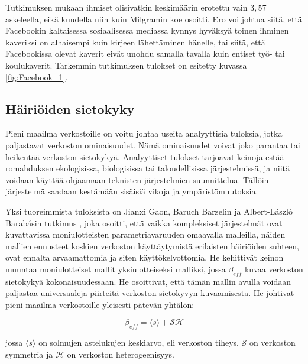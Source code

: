 \documentclass[finnish,12pt,a4paper,pdftex,elec,utf8]{aaltothesis}
\begin{document}
Tutkimuksen mukaan ihmiset olisivatkin keskimäärin erotettu vain $3,57$ askeleella, eikä kuudella niin kuin Milgramin koe osoitti. Ero voi johtua siitä, että Facebookin kaltaisessa sosiaalisessa mediassa kynnys hyväksyä toinen ihminen kaveriksi on alhaisempi kuin kirjeen lähettäminen hänelle, tai siitä, että Facebookissa olevat kaverit eivät unohdu samalla tavalla kuin entiset työ- tai koulukaverit. Tarkemmin tutkimuksen tulokset on esitetty kuvassa \ref{fig:Facebook_1}.

\subsection{Häiriöiden sietokyky}
\label{subsec:Sietokyky}

Pieni maailma verkostoille on voitu johtaa useita analyyttisia tuloksia, jotka paljastavat verkoston ominaisuudet. Nämä ominaisuudet voivat joko parantaa tai heikentää verkoston sietokykyä. Analyyttiset tulokset tarjoavat keinoja estää romahduksen ekologisissa, biologisissa tai taloudellisissa järjestelmissä, ja niitä voidaan käyttää ohjaamaan teknisten järjestelmien suunnittelua. Tällöin järjestelmä saadaan kestämään sisäisiä vikoja ja ympäristömuutoksia.

Yksi tuoreimmista tuloksista on Jianxi Gaon, Baruch Barzelin ja Albert-László Barabásin tutkimus \cite{Universal-resilience}, joka osoitti, että vaikka kompleksiset järjestelmät ovat kuvattavissa moniulotteisten parametriavaruuden omaavalla malleilla, näiden mallien ennusteet koskien verkoston käyttäytymistä erilaisten häiriöiden suhteen, ovat ennalta arvaamattomia ja siten käyttökelvottomia. He kehittivät keinon muuntaa moniulotteiset mallit yksiulotteiseksi malliksi, jossa $\beta_{eff}$ kuvaa verkoston sietokykyä kokonaisuudessaan. He osoittivat, että tämän mallin avulla voidaan paljastaa universaaleja piirteitä verkoston sietokyvyn kuvaamisesta. He johtivat pieni maailma verkostoille yleisesti pätevän yhtälön:

$$\beta_{eff} = \langle s \rangle + \mathcal{S} \mathcal{H}$$

jossa $\langle s \rangle$ on solmujen astelukujen keskiarvo, eli verkoston tiheys, $\mathcal{S}$ on verkoston symmetria ja $\mathcal{H}$ on verkoston heterogeenisyys.
\end{document}
